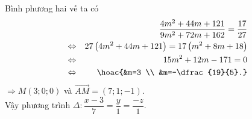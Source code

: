 \begin{ex}
{		Bình phương hai  vế ta có
		\begin{eqnarray*}
			&&\dfrac{4m^2+44m+121}{9m^2+72m+162}=\dfrac{17}{27}  \\
			 &\Leftrightarrow &27\left(4m^2+44m+121\right)=17\left(m^2+8m+18\right) \\
			&\Leftrightarrow &15m^2+12m-171=0  \\
			&\Leftrightarrow &\hoac{&m=3  \\ &m=-\dfrac{19}{5}.}
		\end{eqnarray*}
		$\Rightarrow  M(3;0;0)$ và $\overrightarrow{AM}=(7;1;-1)$. \\
		Vậy  phương trình $\Delta \colon \dfrac{x-3}{7}=\dfrac{y}{1}=\dfrac{-z}{1}$.
	} 
\end{ex}

